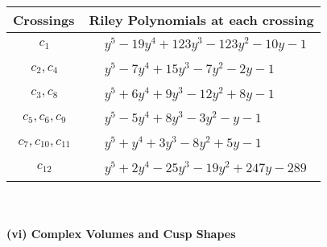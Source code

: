 \documentclass[1p]{elsarticle_modified}
\theoremstyle{definition}
\begin{document}
\begin{tabular}{m{50pt}|m{274pt}}
Crossings & \hspace{64pt}Riley Polynomials at each crossing \\
\hline $$\begin{aligned}c_{1}\end{aligned}$$&$\begin{aligned}
&y^5-19 y^4+123 y^3-123 y^2-10 y-1
\end{aligned}$\\
\hline $$\begin{aligned}c_{2},c_{4}\end{aligned}$$&$\begin{aligned}
&y^5-7 y^4+15 y^3-7 y^2-2 y-1
\end{aligned}$\\
\hline $$\begin{aligned}c_{3},c_{8}\end{aligned}$$&$\begin{aligned}
&y^5+6 y^4+9 y^3-12 y^2+8 y-1
\end{aligned}$\\
\hline $$\begin{aligned}c_{5},c_{6},c_{9}\end{aligned}$$&$\begin{aligned}
&y^5-5 y^4+8 y^3-3 y^2- y-1
\end{aligned}$\\
\hline $$\begin{aligned}c_{7},c_{10},c_{11}\end{aligned}$$&$\begin{aligned}
&y^5+y^4+3 y^3-8 y^2+5 y-1
\end{aligned}$\\
\hline $$\begin{aligned}c_{12}\end{aligned}$$&$\begin{aligned}
&y^5+2 y^4-25 y^3-19 y^2+247 y-289
\end{aligned}$\\
\hline
\end{tabular}\\~\\
\newpage\flushleft \textbf{(vi) Complex Volumes and Cusp Shapes}
\end{document}
